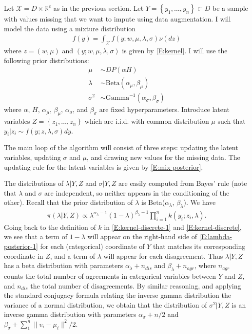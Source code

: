 \documentclass[letterpaper,11pt]{article}
\begin{document}
Let $\mathcal X = D \times \mathbb R^c$ as in the previous section. Let $Y = \left\{ y_1, \dots, y_n \right\} \subset D$ be a sample with values missing that we want to impute using data augmentation. I will model the data using a mixture distribution
\begin{align}\label{E:mix-model}
    f(y) = \int_{\mathcal X} f(y; w, \mu, \lambda, \sigma) \nu(dz)
\end{align}
where $z = (w, \mu)$ and $(y; w, \mu, \lambda, \sigma)$ is given by \eqref{E:kernel}. I will use the following prior distributions:
\begin{align*}
    \mu &\sim DP(\alpha H) \\
    \lambda &\sim \text{Beta}(\alpha_\mu, \beta_\mu) \\
    \sigma^2 &\sim \text{Gamma}^{-1}(\alpha_\sigma, \beta_\sigma)
\end{align*}
where $\alpha$, $H$, $\alpha_\mu$, $\beta_\mu$, $\alpha_\sigma$, and $\beta_\sigma$ are fixed hyperparameters. Introduce latent variables $Z = \left\{ z_1, \dots, z_n \right\}$ which are i.i.d. with common distribution $\mu$ such that $y_i | z_i \sim f(y; z, \lambda, \sigma)dy$.

The main loop of the algorithm will consist of three steps: updating the latent variables, updating $\sigma$ and $\mu$, and drawing new values for the missing data. The updating rule for the latent variables is given by \eqref{E:mix-posterior}.

The distributions of $\lambda | Y, Z$ and $\sigma | Y, Z$ are easily computed from Bayes' rule (note that $\lambda$ and $\sigma$ are independent, so neither appears in the conditioning of the other). Recall that the prior distribution of $\lambda$ is Beta($\alpha_\lambda$, $\beta_\lambda$). We have
\begin{align}\label{E:lambda-posterior-1}
    \pi(\lambda|Y, Z) \propto \lambda^{\alpha_\lambda - 1}(1 - \lambda)^{\beta_\lambda - 1} \prod_{i=1}^n k(y_i ; z_i, \lambda).
\end{align}
Going back to the definition of $k$ in \eqref{E:kernel-discrete-1} and \eqref{E:kernel-discrete},  we see that a term of $1 - \lambda$ will appear on the right-hand side of \eqref{E:lambda-posterior-1} for each (categorical) coordinate of $Y$ that matches its corresponding coordinate in $Z$, and a term of $\lambda$ will appear for each disagreement. Thus $\lambda|Y, Z$ has a beta distribution with parameters $\alpha_\lambda + n_{dis}$ and $\beta_\lambda + n_{agr}$, where $n_{agr}$ counts the total number of agreements in categorical variables between $Y$ and $Z$, and $n_{dis}$ the total number of disagreements. By similar reasoning, and applying the standard conjugacy formula relating the inverse gamma distribution the variance of a normal distribution, we obtain that the distribution of $\sigma^2 | Y, Z$ is an inverse gamma distribution with parameters $\alpha_\sigma + n/2$ and $\beta_\sigma + \sum_1^n \|v_i - \mu_i\|^2 / 2$.
\end{document}
